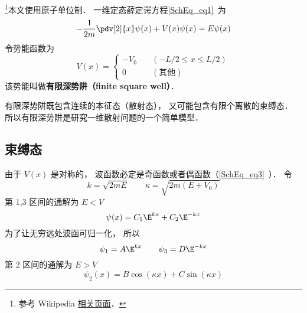 
\begin{issues}
\issueTODO
\end{issues}





\footnote{参考 Wikipedia \href{https://en.wikipedia.org/wiki/Finite_potential_well}{相关页面}．}本文使用原子单位制． 一维定态薛定谔方程\autoref{SchEq_eq1}~为
\begin{equation}
-\frac{1}{2m}\pdv[2]{x}\psi(x) + V(x) \psi(x) = E \psi(x)
\end{equation}
令势能函数为
\begin{equation}
V(x) = \begin{cases}
-V_0 \quad &(-L/2 \leqslant x \leqslant L/2)\\
0 \quad &(\text{其他})
\end{cases}
\end{equation}
该势能叫做\textbf{有限深势阱（finite square well）}．

有限深势阱既包含连续的本征态（散射态）， 又可能包含有限个离散的束缚态． %
所以有限深势阱是研究一维散射问题的一个简单模型．

\subsection{束缚态}
由于 $V(x)$ 是对称的， 波函数必定是奇函数或者偶函数（\autoref{SchEq_eq3}~）． 令
\begin{equation}
k = \sqrt{2mE} \qquad \kappa = \sqrt{2m(E + V_0)}
\end{equation}
第 1,3 区间的通解为 $E < V$
\begin{equation}
\psi(x) = C_1 \E^{kx} + C_2 \E^{-kx}
\end{equation}
为了让无穷远处波函可归一化， 所以
\begin{equation}
\psi_1 = A \E^{kx} \qquad \psi_3 = D\E^{-kx}
\end{equation}
第 2 区间的通解为 $E > V$
\begin{equation}
\psi_2(x) = B \cos(\kappa x) + C\sin(\kappa x)
\end{equation}

